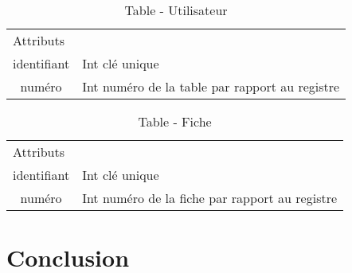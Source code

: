 \documentclass[a4paper]{article}
\begin{document}
\begin{table}[H]
  \centering
   \small
	\begin{tabular}{|c|p{12cm}|}
   		\hline
   			\rowcolor{lightgray}\multicolumn{2}{|c|}{\textbf{Table - Table}} \\
   		\hline
   			\multicolumn{2}{|l|}{Attributs} \\
   		\hline
			identifiant & Int clé unique \\
			numéro & Int numéro de la table par rapport au registre \\
		\hline
 	\end{tabular}
  \caption{Table - Utilisateur}
  \normalsize
  \label{tab: table_utilisateur}
\end{table}

\begin{table}[H]
  \centering
   \small
	\begin{tabular}{|c|p{12cm}|}
   		\hline
   			\rowcolor{lightgray}\multicolumn{2}{|c|}{\textbf{Table - Fiche}} \\
   		\hline
   			\multicolumn{2}{|l|}{Attributs} \\
   		\hline
			identifiant & Int clé unique \\
			numéro & Int numéro de la fiche par rapport au registre \\
   		\hline
 	\end{tabular}
  \caption{Table - Fiche}
  \normalsize
  \label{tab: table_fiche}
\end{table}


\newpage
{}
{}
\section*{Conclusion}


\appendix
\end{document}
